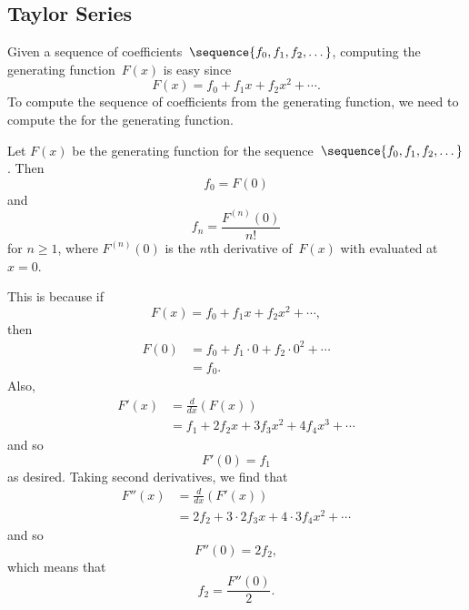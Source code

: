 \subsection{Taylor Series}

Given a sequence of coefficients~$\sequence{f_0, f_1, f_2, \dots}$,
computing the generating function~$F(x)$ is easy since
\begin{equation*}
    F(x) = f_0 + f_1 x + f_2 x^2 + \cdots.
\end{equation*}
To compute the sequence of coefficients from the generating function,
we need to compute the  for the generating
function.

\begin{rul}
Let $F(x)$ be the generating function for the sequence~$\sequence{f_0,
  f_1, f_2, \dots}$.  Then
\begin{equation*}
    f_0 = F(0)
\end{equation*}
and
\begin{equation*}
    f_n = \frac{F^{(n)}(0)}{n!}
\end{equation*}
for $n \ge 1$, where $F^{(n)}(0)$ is the $n$th derivative of~$F(x)$
with evaluated at~$x = 0$.
\end{rul}

This is because if
\begin{equation*}
    F(x) = f_0 + f_1 x + f_2 x^2 + \cdots,
\end{equation*}
then
\begin{align*}
    F(0) &= f_0 + f_1 \cdot 0 + f_2 \cdot 0^2 + \cdots \\
         &= f_0.
\end{align*}
Also,
\begin{align*}
F'(x)   &= \frac{d}{dx} (F(x)) \\
        &= f_1 + 2 f_2 x + 3 f_3 x^2 + 4 f_4 x^3 + \cdots
\end{align*}
and so
\begin{equation*}
    F'(0) = f_1
\end{equation*}
as desired.  Taking second derivatives, we find that
\begin{align*}
F''(x)  &= \frac{d}{dx} (F'(x)) \\
        &= 2 f_2 + 3 \cdot 2 f_3 x + 4 \cdot 3 f_4 x^2 + \cdots
\end{align*}
and so
\begin{equation*}
    F''(0) = 2 f_2,
\end{equation*}
which means that
\begin{equation*}
    f_2 = \frac{F''(0)}{2}.
\end{equation*}

